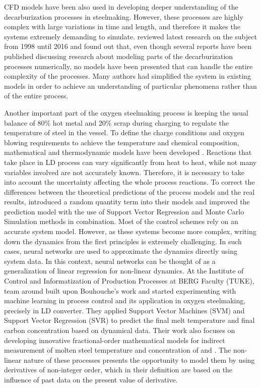 CFD models have been also used in developing deeper understanding of the decarburization processes in steelmaking. However, these processes are highly complex with large variations in time and length, and therefore it makes the systems extremely demanding to simulate. \citet{Ersson2018} reviewed latest research on the subject from 1998 until 2016 and found out that, even though several reports have been published discussing research about modeling parts of the decarburization processes numerically, no models have been presented that can handle the entire complexity of the processes. Many authors had simplified the system in existing models in order to achieve an understanding of particular phenomena rather than of the entire process.

Another important part of the oxygen steelmaking process is keeping the usual balance of 80\% hot metal and 20\% scrap during charging to regulate the temperature of steel in the vessel. To define the charge conditions and oxygen blowing requirements to achieve the temperature and chemical composition, mathematical and thermodynamic models have been developed \citep{Kacur2019,Sprava2018}. Reactions that take place in LD process can vary significantly from heat to heat, while not many variables involved are not accurately known. Therefore, it is necessary to take into account the uncertainty affecting the whole process reactions. To correct the differences between the theoretical predictions of the process models and the real results, \citet{Bouhouche2012} introduced a random quantity term into their models and improved the prediction model with the use of Support Vector Regression and Monte Carlo Simulation methods in combination. Most of the control schemes rely on an accurate system model. However, as these systems become more complex, writing down the dynamics from the first principles is extremely challenging. In such cases, neural networks are used to approximate the dynamics directly using system data. In this context, neural networks can be thought of as a generalization of linear regression for non-linear dynamics. At the Institute of Control and Informatization of Production Processes at BERG Faculty (TUKE), team around \citet{Sprava2018} built upon Bouhouche's work and started experimenting with machine learning in process control and its application in oxygen steelmaking, precisely in LD converter. They applied Support Vector Machines (SVM) and Support Vector Regression (SVR) to predict the final melt temperature and final carbon concentration based on dynamical data. Their work also focuses on developing innovative fractional-order mathematical models for indirect measurement of molten steel temperature and concentration of  and . The non-linear nature of these processes presents the opportunity to model them by using derivatives of non-integer order, which in their definition are based on the influence of past data on the present value of derivative.

